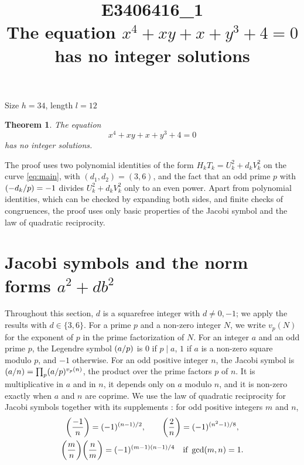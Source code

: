 \documentclass[11pt]{article}
\title{\textbf{E3406416\_1}\\[4pt] {\Large The equation $x^{4}+xy+x+y^{3}+4=0$ has no integer solutions}}
\author{}
\date{}
\newtheorem{theorem}{Theorem}
\newcommand{\leg}[2]{\mathchoice{\biggl(\dfrac{#1}{#2}\biggr)}{(#1/#2)}{(#1/#2)}{(#1/#2)}}
\begin{document}
\maketitle
\vspace{-8ex}
\begin{center}
Size $h=34$, length $l=12$
\end{center}

\begin{theorem}\label{thm:main}
The equation
\begin{equation}\label{eq:main}
x^{4}+xy+x+y^{3}+4=0
\end{equation}
has no integer solutions.
\end{theorem}

The proof uses two polynomial identities of the form $H_kT_k=U_k^2+d_kV_k^2$ on the curve \eqref{eq:main}, with $(d_1,d_2)=(3,6)$, and the fact that an odd prime $p$ with $\leg{-d_k}{p}=-1$ divides $U_k^2+d_kV_k^2$ only to an even power. Apart from polynomial identities, which can be checked by expanding both sides, and finite checks of congruences, the proof uses only basic properties of the Jacobi symbol and the law of quadratic reciprocity.

\section{Jacobi symbols and the norm forms $a^2+db^2$}

Throughout this section, $d$ is a squarefree integer with $d\neq0,-1$; we apply the results with $d\in\{3,6\}$. For a prime $p$ and a non-zero integer $N$, we write $v_p(N)$ for the exponent of $p$ in the prime factorization of $N$. For an integer $a$ and an odd prime $p$, the Legendre symbol $\leg{a}{p}$ is $0$ if $p\mid a$, $1$ if $a$ is a non-zero square modulo $p$, and $-1$ otherwise. For an odd positive integer $n$, the Jacobi symbol is $\leg{a}{n}=\prod_p\leg{a}{p}^{v_p(n)}$, the product over the prime factors $p$ of $n$. It is multiplicative in $a$ and in $n$, it depends only on $a$ modulo $n$, and it is non-zero exactly when $a$ and $n$ are coprime. We use the law of quadratic reciprocity for Jacobi symbols together with its supplements \cite[Chapter~5, \S2]{IR}: for odd positive integers $m$ and $n$,
\begin{gather*}
\leg{-1}{n}=(-1)^{(n-1)/2},\qquad\leg{2}{n}=(-1)^{(n^2-1)/8},\\
\leg{m}{n}\leg{n}{m}=(-1)^{(m-1)(n-1)/4}\quad\text{if }\gcd(m,n)=1.
\end{gather*}
\end{document}
